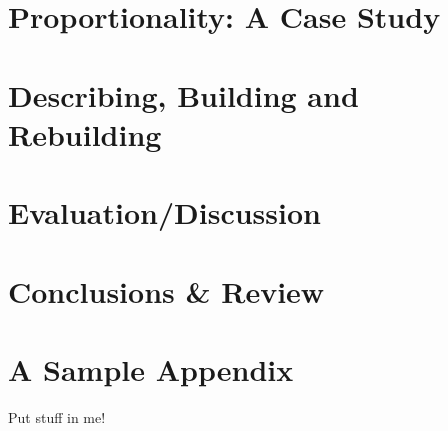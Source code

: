 \documentclass[10pt,oneside,a4paper,onecolumn,titlepage,draft]{lancsthesis}
\begin{document}
\chapter{Proportionality: A Case Study}




% 


\chapter{Describing, Building and Rebuilding}


\chapter{Evaluation/Discussion}


\chapter{Conclusions \& Review}



\pagebreak%
%
\backmatter%



\pagebreak
\appendix
{}


\chapter{A Sample Appendix}
Put stuff in me!


\end{document}
